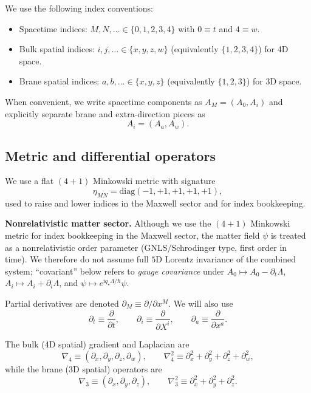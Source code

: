 \documentclass[11pt]{article}
\newcommand{\ii}{\mathrm{i}}
\newcommand{\qstar}{q_\star}
\begin{document}
We use the following index conventions:
\begin{itemize}[leftmargin=2.0em]
\item Spacetime indices: $M,N,\ldots \in \{0,1,2,3,4\}$ with $0\equiv t$ and $4\equiv w$.
\item Bulk spatial indices: $i,j,\ldots \in \{x,y,z,w\}$ (equivalently $\{1,2,3,4\}$) for 4D space.
\item Brane spatial indices: $a,b,\ldots \in \{x,y,z\}$ (equivalently $\{1,2,3\}$) for 3D space.
\end{itemize}

When convenient, we write spacetime components as $A_M=(A_0,A_i)$ and explicitly separate brane and extra-direction pieces as
\begin{equation}
A_i = (A_a, A_w).
\end{equation}

\subsection{Metric and differential operators}
\label{sec:operators}

We use a flat $(4+1)$ Minkowski metric with signature
\begin{equation}
\eta_{MN}=\mathrm{diag}(-1,+1,+1,+1,+1),
\end{equation}
used to raise and lower indices in the Maxwell sector and for index bookkeeping.

\noindent\textbf{Nonrelativistic matter sector.} Although we use the $(4+1)$ Minkowski metric for index bookkeeping in the Maxwell sector, the matter field $\psi$ is treated as a nonrelativistic order parameter (GNLS/Schrodinger type, first order in time). We therefore do not assume full $5$D Lorentz invariance of the combined system; ``covariant'' below refers to \emph{gauge covariance} under $A_0\mapsto A_0-\partial_t\Lambda$, $A_i\mapsto A_i+\partial_i\Lambda$, and $\psi\mapsto e^{\ii \qstar \Lambda/\hbar}\psi$.

Partial derivatives are denoted $\partial_M \equiv \partial/\partial x^M$. We will also use
\begin{equation}
\partial_t \equiv \frac{\partial}{\partial t},
\qquad
\partial_i \equiv \frac{\partial}{\partial X^i},
\qquad
\partial_a \equiv \frac{\partial}{\partial x^a}.
\end{equation}

The bulk (4D spatial) gradient and Laplacian are
\begin{equation}
\nabla_4 \equiv (\partial_x,\partial_y,\partial_z,\partial_w),
\qquad
\nabla_4^2 \equiv \partial_x^2+\partial_y^2+\partial_z^2+\partial_w^2,
\end{equation}
while the brane (3D spatial) operators are
\begin{equation}
\nabla_3 \equiv (\partial_x,\partial_y,\partial_z),
\qquad
\nabla_3^2 \equiv \partial_x^2+\partial_y^2+\partial_z^2.
\end{equation}
\end{document}
